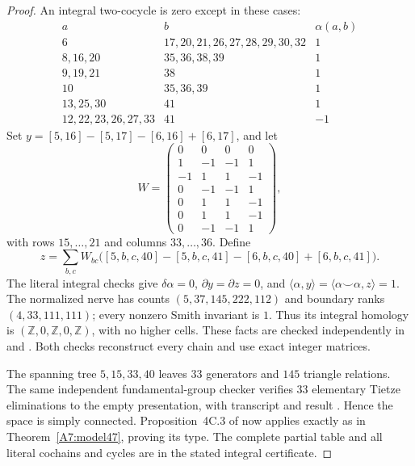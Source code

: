 \begin{proof}
An integral two-cocycle is zero except in these cases:
\[
\begin{array}{c|l|r}
a&b&\alpha(a,b)\\\hline
6&17,20,21,26,27,28,29,30,32&1\\
8,16,20&35,36,38,39&1\\
9,19,21&38&1\\
10&35,36,39&1\\
13,25,30&41&1\\
12,22,23,26,27,33&41&-1
\end{array}
\]
Set $y=[5,16]-[5,17]-[6,16]+[6,17]$, and let
\[
W=\begin{pmatrix}
0&0&0&0\\
1&-1&-1&1\\
-1&1&1&-1\\
0&-1&-1&1\\
0&1&1&-1\\
0&1&1&-1\\
0&-1&-1&1
\end{pmatrix},
\]
with rows $15,\ldots,21$ and columns $33,\ldots,36$. Define
\[
 z=\sum_{b,c}W_{bc}
  \bigl([5,b,c,40]-[5,b,c,41]
        -[6,b,c,40]+[6,b,c,41]\bigr).
\]
The literal integral checks give $\delta\alpha=0$,
$\partial y=\partial z=0$, and
$\langle\alpha,y\rangle=\langle\alpha\smile\alpha,z\rangle=1$.
The normalized nerve has counts $(5,37,145,222,112)$ and boundary
ranks $(4,33,111,111)$; every nonzero Smith invariant is $1$.
Thus its integral homology is $(\mathbb Z,0,\mathbb Z,0,\mathbb Z)$,
with no higher cells. These facts are checked independently in
 and
.
Both checks reconstruct every chain and use exact integer matrices.

The spanning tree $5,15,33,40$ leaves $33$ generators and $145$
triangle relations. The same independent fundamental-group
checker verifies $33$ elementary Tietze eliminations to the empty
presentation, with transcript
 and result
.
Hence the space is simply connected. Proposition~4C.3 of
\cite{CP2-Hatcher2002} now applies exactly as in
Theorem~\ref{A7:model47}, proving its type.
The complete partial table and all literal cochains and cycles
are in the stated integral certificate.
\end{proof}


